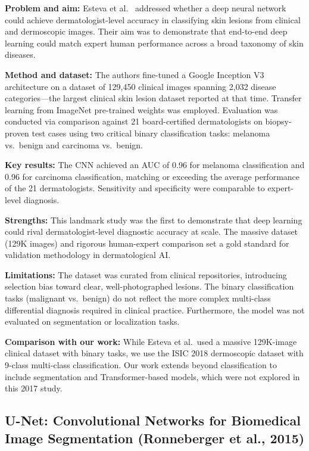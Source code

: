 \documentclass[10pt,twocolumn]{article}
\begin{document}
\textbf{Problem and aim:} Esteva et al.\ \cite{Esteva2017} addressed whether a deep neural network could achieve dermatologist-level accuracy in classifying skin lesions from clinical and dermoscopic images. Their aim was to demonstrate that end-to-end deep learning could match expert human performance across a broad taxonomy of skin diseases.

\textbf{Method and dataset:} The authors fine-tuned a Google Inception V3 architecture on a dataset of 129,450 clinical images spanning 2,032 disease categories---the largest clinical skin lesion dataset reported at that time. Transfer learning from ImageNet pre-trained weights was employed. Evaluation was conducted via comparison against 21 board-certified dermatologists on biopsy-proven test cases using two critical binary classification tasks: melanoma vs.\ benign and carcinoma vs.\ benign.

\textbf{Key results:} The CNN achieved an AUC of 0.96 for melanoma classification and 0.96 for carcinoma classification, matching or exceeding the average performance of the 21 dermatologists. Sensitivity and specificity were comparable to expert-level diagnosis.

\textbf{Strengths:} This landmark study was the first to demonstrate that deep learning could rival dermatologist-level diagnostic accuracy at scale. The massive dataset (129K images) and rigorous human-expert comparison set a gold standard for validation methodology in dermatological AI.

\textbf{Limitations:} The dataset was curated from clinical repositories, introducing selection bias toward clear, well-photographed lesions. The binary classification tasks (malignant vs.\ benign) do not reflect the more complex multi-class differential diagnosis required in clinical practice. Furthermore, the model was not evaluated on segmentation or localization tasks.

\textbf{Comparison with our work:} While Esteva et al.\ used a massive 129K-image clinical dataset with binary tasks, we use the ISIC 2018 dermoscopic dataset with 9-class multi-class classification. Our work extends beyond classification to include segmentation and Transformer-based models, which were not explored in this 2017 study.

\subsection{U-Net: Convolutional Networks for Biomedical Image Segmentation (Ronneberger et al., 2015)}
\end{document}
